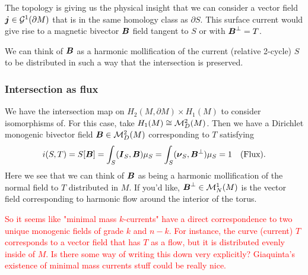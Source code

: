 \documentclass{article}
\begin{document}
 The topology is giving us the physical insight that we can consider a vector field $\boldsymbol{j} \in \mathcal{G}^1(\partial M)$ that is in the same homology class as $\partial S$. This surface current would give rise to a magnetic bivector $\boldsymbol{B}$ field tangent to $S$ or with $\boldsymbol{B}^\perp=T$. 

We can think of $\boldsymbol{B}$ as a harmonic mollification of the current (relative 2-cycle) $S$ to be distributed in such a way that the intersection is preserved. 

\subsubsection{Intersection as flux}
We have the intersection map on $H_2(M,\partial M) \times H_{1}(M)$ to consider isomorphisms of. For this case, take $H_1(M)\cong \mathcal{M}^2_D(M)$. Then we have a Dirichlet monogenic bivector field $\boldsymbol{B}\in \mathcal{M}^2_D(M)$ corresponding to $T$ satisfying
\begin{align*}
i(S,T) = S[\boldsymbol{B}] = \int_S (\boldsymbol{I}_S,\boldsymbol{B}) \mu_S = \int_S (\boldsymbol{\nu}_S,\boldsymbol{B}^\perp) \mu_S  = 1 && \textrm{(Flux)}.
\end{align*}
Here we see that we can think of $\boldsymbol{B}$ as being a harmonic mollification of the normal field to $T$ distributed in $M$. If you'd like, $\boldsymbol{B}^\perp \in \mathcal{M}^1_N(M)$ is the vector field corresponding to harmonic flow around the interior of the torus.  

\textcolor{red}{So it seems like "minimal mass $k$-currents" have a direct correspondence to two unique monogenic fields of grade $k$ and $n-k$. For instance, the curve (current) $T$ corresponds to a vector field that has $T$ as a flow, but it is distributed evenly inside of $M$. Is there some way of writing this down very explicitly? Giaquinta's existence of minimal mass currents stuff could be really nice.}
\end{document}
